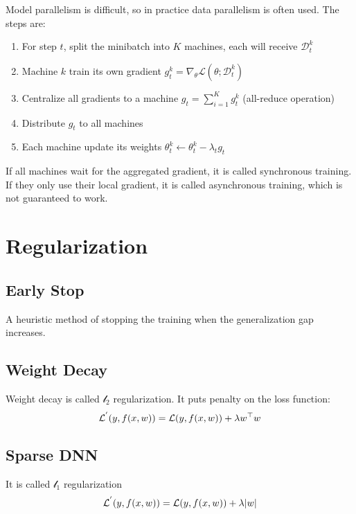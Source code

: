 Model parallelism is difficult, so in practice data parallelism is often used. The steps are:
\begin{enumerate}
    \item For step $t$, split the minibatch into $K$ machines, each will receive $\mathcal{D}_t^k$
    \item Machine $k$ train its own gradient $g_t^k = \nabla_\theta \mathcal{L}(\theta;\mathcal{D}_t^k)$
    \item Centralize all gradients to a machine $g_t = \sum_{i=1}^K g_t^k$ (all-reduce operation)
    \item Distribute $g_t$ to all machines
    \item Each machine update its weights $\theta_t^k \leftarrow \theta_t^k - \lambda_t g_t$
\end{enumerate}

If all machines wait for the aggregated gradient, it is called synchronous training. If they only use their local gradient, it is called asynchronous training, which is not guaranteed to work. 


\section{Regularization}

\subsection{Early Stop}

A heuristic method of stopping the training when the generalization gap increases.

\subsection{Weight Decay}

Weight decay is called $\mathcal{l}_2$ regularization. It puts penalty on the loss function:
\begin{equation}
    \mathcal{L}^{'}(y, f(x,w)) = \mathcal{L}(y, f(x,w)) + \lambda {w}^\top w
\end{equation}

\subsection{Sparse DNN}
It is called $\mathcal{l}_1$ regularization
\begin{equation}
    \mathcal{L}^{'}(y, f(x,w)) = \mathcal{L}(y, f(x,w)) + \lambda \abs{w}
\end{equation}

